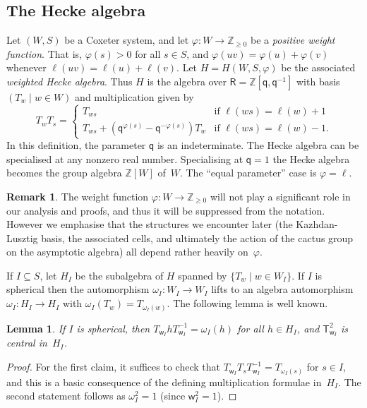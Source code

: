 \documentclass[11pt]{article}
\theoremstyle{plain}
\newtheorem{lemma}[thm]{Lemma}
\theoremstyle{definition}
\newtheorem{remark}[thm]{Remark}
\numberwithin{equation}{section}
\def\sT{\mathsf{T}}
\def\ZZ{\mathbb{Z}}
\def\sR{\mathsf{R}}
\newcommand{\sw}{\mathsf{w}}
\newcommand{\sq}{\mathsf{q}}
\begin{document}
\subsection{The Hecke algebra}

Let $(W,S)$ be a Coxeter system, and let $\varphi:W\to \ZZ_{\geq 0}$ be a \textit{positive weight function}. That is, $\varphi(s)>0$ for all $s\in S$, and $\varphi(uv)=\varphi(u)+\varphi(v)$ whenever $\ell(uv)=\ell(u)+\ell(v)$. Let $H=H(W,S,\varphi)$ be the associated \textit{weighted Hecke algebra}. Thus $H$ is the algebra over $\sR=\ZZ[\sq,\sq^{-1}]$ with basis $(T_w\mid w\in W)$ and multiplication given by
$$
T_wT_s=\begin{cases}
T_{ws}&\text{if $\ell(ws)=\ell(w)+1$}\\
T_{ws}+(\sq^{\varphi(s)}-\sq^{-\varphi(s)})T_w&\text{if $\ell(ws)=\ell(w)-1$}.
\end{cases}
$$
In this definition, the parameter $\sq$ is an indeterminate. The Hecke algebra can be specialised at any nonzero real number. Specialising at $\sq=1$ the Hecke algebra becomes the group algebra $\ZZ[W]$ of~$W$. The ``equal parameter'' case is $\varphi=\ell$. 

\begin{remark}
The weight function $\varphi:W\to \ZZ_{\geq 0}$ will not play a significant role in our analysis and proofs, and thus it will be suppressed from the notation. However we emphasise that the structures we encounter later (the Kazhdan-Lusztig basis, the associated cells, and ultimately the action of the cactus group on the asymptotic algebra) all depend rather heavily on~$\varphi$. 
\end{remark}

If $I\subseteq S$, let $H_I$ be the subalgebra of $H$ spanned by $\{T_w\mid w\in W_I\}$. If $I$ is spherical then the automorphism $\omega_I:W_I\to W_I$ lifts to an algebra automorphism $\omega_I:H_I\to H_I$ with $\omega_I(T_w)=T_{\omega_I(w)}$. The following lemma is well known. 

\begin{lemma}\label{lem:omega}
If $I$ is spherical, then $T_{\sw_I}hT_{\sw_I}^{-1}=\omega_I(h)$ for all $h\in H_I$, and $\sT_{\sw_I}^2$ is central in~$H_I$. 
\end{lemma}

\begin{proof}
For the first claim, it suffices to check that $T_{\sw_I}T_sT_{\sw_I}^{-1}=T_{\omega_I(s)}$ for $s\in I$, and this is a basic consequence of the defining multiplication formulae in~$H_I$. The second statement follows as $\omega_I^2=1$ (since $\sw_I^2=1$). 
\end{proof}
\end{document}
